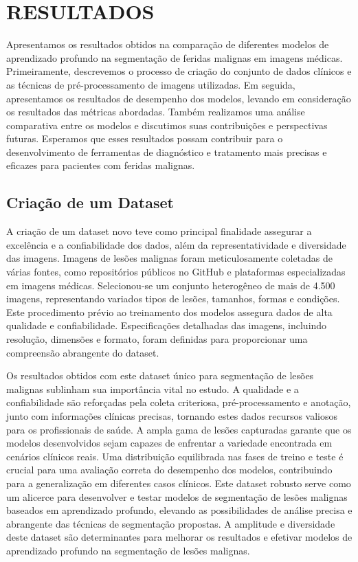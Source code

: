 \section{RESULTADOS}

Apresentamos os resultados obtidos na comparação de diferentes modelos de aprendizado profundo na segmentação de feridas malignas em imagens médicas. Primeiramente, descrevemos o processo de criação do conjunto de dados clínicos e as técnicas de pré-processamento de imagens utilizadas. Em seguida, apresentamos os resultados de desempenho dos modelos, levando em consideração os resultados das métricas abordadas. Também realizamos uma análise comparativa entre os modelos e discutimos suas contribuições e perspectivas futuras. Esperamos que esses resultados possam contribuir para o desenvolvimento de ferramentas de diagnóstico e tratamento mais precisas e eficazes para pacientes com feridas malignas.

\subsection{Criação de um Dataset}
A criação de um dataset novo teve como principal finalidade assegurar a excelência e a confiabilidade dos dados, além da representatividade e diversidade das imagens. Imagens de lesões malignas foram meticulosamente coletadas de várias fontes, como repositórios públicos no GitHub e plataformas especializadas em imagens médicas. Selecionou-se um conjunto heterogêneo de mais de 4.500 imagens, representando variados tipos de lesões, tamanhos, formas e condições. Este procedimento prévio ao treinamento dos modelos assegura dados de alta qualidade e confiabilidade. Especificações detalhadas das imagens, incluindo resolução, dimensões e formato, foram definidas para proporcionar uma compreensão abrangente do dataset.

Os resultados obtidos com este dataset único para segmentação de lesões malignas sublinham sua importância vital no estudo. A qualidade e a confiabilidade são reforçadas pela coleta criteriosa, pré-processamento e anotação, junto com informações clínicas precisas, tornando estes dados recursos valiosos para os profissionais de saúde. A ampla gama de lesões capturadas garante que os modelos desenvolvidos sejam capazes de enfrentar a variedade encontrada em cenários clínicos reais. Uma distribuição equilibrada nas fases de treino e teste é crucial para uma avaliação correta do desempenho dos modelos, contribuindo para a generalização em diferentes casos clínicos. Este dataset robusto serve como um alicerce para desenvolver e testar modelos de segmentação de lesões malignas baseados em aprendizado profundo, elevando as possibilidades de análise precisa e abrangente das técnicas de segmentação propostas. A amplitude e diversidade deste dataset são determinantes para melhorar os resultados e efetivar modelos de aprendizado profundo na segmentação de lesões malignas.

